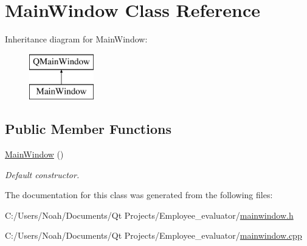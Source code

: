 \hypertarget{class_main_window}{\section{Main\-Window Class Reference}
\label{class_main_window}
}
Inheritance diagram for Main\-Window\-:\begin{figure}[H]
\begin{center}
\leavevmode
\includegraphics[height=2.000000cm]{class_main_window}
\end{center}
\end{figure}
\subsection*{Public Member Functions}
\begin{DoxyCompactItemize}
\item 
\hypertarget{class_main_window_a34c4b4207b46d11a4100c9b19f0e81bb}{\hyperlink{class_main_window_a34c4b4207b46d11a4100c9b19f0e81bb}{Main\-Window} ()}\label{class_main_window_a34c4b4207b46d11a4100c9b19f0e81bb}

\begin{DoxyCompactList}\small\item\em Default constructor. \end{DoxyCompactList}\end{DoxyCompactItemize}


The documentation for this class was generated from the following files\-:\begin{DoxyCompactItemize}
\item 
C\-:/\-Users/\-Noah/\-Documents/\-Qt Projects/\-Employee\-\_\-evaluator/\hyperlink{mainwindow_8h}{mainwindow.\-h}\item 
C\-:/\-Users/\-Noah/\-Documents/\-Qt Projects/\-Employee\-\_\-evaluator/\hyperlink{mainwindow_8cpp}{mainwindow.\-cpp}\end{DoxyCompactItemize}
